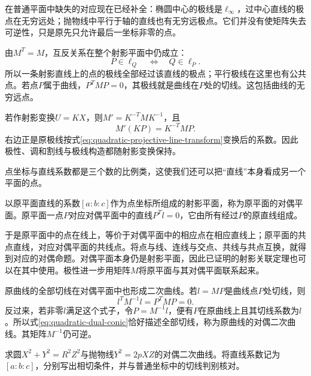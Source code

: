 在普通平面中缺失的对应现在已经补全：椭圆中心的极线是\(\ell_\infty\)，过中心直线的极点在无穷远处；抛物线中平行于轴的直线也有无穷远极点。它们并没有使矩阵失去可逆性，只是原先只允许最后一坐标非零的点。

由\(M^T=M\)，互反关系在整个射影平面中仍成立：
\begin{equation*}
 P\in\ell_Q\quad\Longleftrightarrow\quad Q\in\ell_P.
\end{equation*}
所以一条射影直线上的点的极线全部经过该直线的极点；平行极线在这里也有公共点。若点\(P\)属于曲线，\(P^TMP=0\)，其极线就是曲线在\(P\)处的切线。这包括曲线的无穷远点。

若作射影变换\(U=KX\)，则\(M'=K^{-T}MK^{-1}\)，且
\begin{equation*}
 M'(KP)=K^{-T}MP.
\end{equation*}
右边正是原极线按式\eqref{eq:quadratic-projective-line-transform}变换后的系数。因此极性、调和割线与极线构造都随射影变换保持。

点坐标与直线系数都是三个数的比例类，这使我们还可以把“直线”本身看成另一个平面的点。

\begin{definition}
以原平面直线的系数\([a:b:c]\)作为点坐标所组成的射影平面，称为原平面的{\heiti{}对偶平面}。原平面一点\(P\)对应对偶平面中的直线\(P^Tl=0\)，它由所有经过\(P\)的原直线组成。
\end{definition}

于是原平面中的点在线上，等价于对偶平面中的相应点在相应直线上；原平面的共点直线，对应对偶平面的共线点。将点与线、连线与交点、共线与共点互换，就得到对应的{\heiti{}对偶命题}。对偶平面本身仍是射影平面，因此已证明的射影关联定理也可以在其中使用。极性进一步用矩阵\(M\)将原平面与其对偶平面联系起来。

原曲线的全部切线在对偶平面中也形成二次曲线。若\(l=MP\)是曲线点\(P\)处切线，则
\begin{equation}\label{eq:quadratic-dual-conic}
 l^TM^{-1}l=P^TMP=0.
\end{equation}
反过来，若非零\(l\)满足这个式子，令\(P=M^{-1}l\)，便有\(P\)在原曲线上且其切线系数为\(l\)。所以式\eqref{eq:quadratic-dual-conic}恰好描述全部切线，称为原曲线的{\heiti{}对偶二次曲线}。其矩阵\(M^{-1}\)仍可逆。

\par\addvspace{6pt}
\noindent\begin{minipage}{\linewidth}
\begin{example}
求圆\(X^2+Y^2=R^2Z^2\)与抛物线\(Y^2=2pXZ\)的对偶二次曲线。将直线系数记为\([a:b:c]\)，分别写出相切条件，并与普通坐标中的切线判别核对。
\end{example}
\end{minipage}\par\addvspace{6pt}

